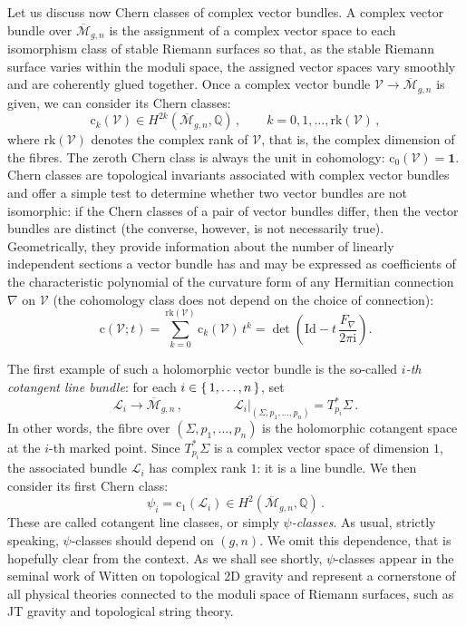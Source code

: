 \documentclass[11pt,reqno]{amsart}
\numberwithin{equation}{section}
\newcommand{\Id}{\mathrm{Id}}
\newcommand{\iu}{\mathrm{i}}
\newcommand{\rk}{\mathrm{rk}}
\newcommand{\cc}{\mathrm{c}}
\newcommand{\mb}[1]{\mathbb{#1}}
\newcommand{\mc}[1]{\mathcal{#1}}
\newcommand{\Q}{\mb{Q}}
\newcommand{\M}{\mc{M}}
\newcommand{\Mbar}{\overline{\M}}
\theoremstyle{plain}
\theoremstyle{definition}
\begin{document}
Let us discuss now Chern classes of complex vector bundles. A complex vector bundle over $\Mbar_{g,n}$ is the assignment of a complex vector space to each isomorphism class of stable Riemann surfaces so that, as the stable Riemann surface varies within the moduli space, the assigned vector spaces vary smoothly and are coherently glued together. Once a complex vector bundle $\mc{V} \to \Mbar_{g,n}$ is given, we can consider its Chern classes:
\begin{equation}
  \cc_k(\mc{V}) \in H^{2k}(\Mbar_{g,n},\Q) \,,
  \qquad
  k = 0,1,\dots,\rk(\mc{V}) \,,
\end{equation}
where $\rk(\mc{V})$ denotes the complex rank of $\mc{V}$, that is, the complex dimension of the fibres. The zeroth Chern class is always the unit in cohomology: $\cc_0(\mc{V}) = \bm{1}$. Chern classes are topological invariants associated with complex vector bundles and offer a simple test to determine whether two vector bundles are not isomorphic: if the Chern classes of a pair of vector bundles differ, then the vector bundles are distinct (the converse, however, is not necessarily true). Geometrically, they provide information about the number of linearly independent sections a vector bundle has and may be expressed as coefficients of the characteristic polynomial of the curvature form of any Hermitian connection $\nabla$ on $\mc{V}$ (the cohomology class does not depend on the choice of connection):
\begin{equation}
  \cc(\mc{V};t) = \sum_{k=0}^{\rk(\mc{V})} \cc_k(\mc{V}) \, t^k
  =
  \det\left( \Id - t \, \frac{F_{\nabla}}{2\pi\iu} \right) .
\end{equation} 

The first example of such a holomorphic vector bundle is the so-called \emph{$i$-th cotangent line bundle}: for each $i \in \set{1,\dots,n}$, set
\begin{equation}
  \mc{L}_i \longrightarrow \Mbar_{g,n} \,,
  \qquad\qquad
  \mc{L}_i|_{(\Sigma,p_1,\dots,p_n)}
  =
  T_{p_i}^*\Sigma \,.
\end{equation}
In other words, the fibre over $(\Sigma,p_1,\dots,p_n)$ is the holomorphic cotangent space at the $i$-th marked point. Since $T_{p_i}^*\Sigma$ is a complex vector space of dimension $1$, the associated bundle $\mc{L}_i$ has complex rank $1$: it is a line bundle. We then consider its first Chern class:
\begin{equation}
  \psi_i
  =
  \cc_1(\mc{L}_i) \in H^2(\Mbar_{g,n},\Q) \,.
\end{equation}
These are called cotangent line classes, or simply \emph{$\psi$-classes}. As usual, strictly speaking, $\psi$-classes should depend on $(g,n)$. We omit this dependence, that is hopefully clear from the context. As we shall see shortly, $\psi$-classes appear in the seminal work of Witten on topological 2D gravity \cite{Wit91} and represent a cornerstone of all physical theories connected to the moduli space of Riemann surfaces, such as JT gravity and topological string theory.
\end{document}

